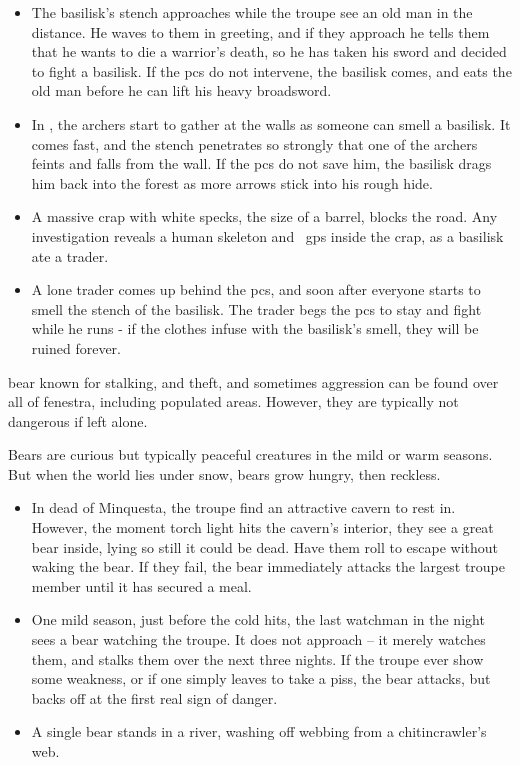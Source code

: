 \begin{multicols}{2}
\begin{itemize}
  \item{The basilisk's stench approaches while the troupe see an old man in the distance.
  He waves to them in greeting, and if they approach he tells them that he wants to die a warrior's death, so he has taken his sword and decided to fight a basilisk.
  If the \glspl{pc} do not intervene, the basilisk comes, and eats the old man before he can lift his heavy broadsword.}
  \item
  In , the archers start to gather at the walls as someone can smell a basilisk.
  It comes fast, and the stench penetrates so strongly that one of the archers feints and falls from the wall.
  If the \glspl{pc} do not save him, the basilisk drags him back into the forest as more arrows stick into his rough hide.
  \item
  \randomdozen
  A massive crap with white specks, the size of a barrel, blocks the road.
  Any investigation reveals a human skeleton and ~\glspl{gp} inside the crap, as a basilisk ate a trader.
  \item
  A lone trader comes up behind the \glspl{pc}, and soon after everyone starts to smell the stench of the basilisk.
  The trader begs the \glspl{pc} to stay and fight while he runs - if the clothes infuse with the basilisk's smell, they will be ruined forever.
\end{itemize}

  {bear}%
  {known for stalking, and theft, and sometimes aggression}%
can be found over all of \gls{fenestra}, including populated areas.
However, they are typically not dangerous if left alone.

\bear

\showEnc
Bears are curious but typically peaceful creatures in the mild or warm seasons.
But when the world lies under snow, bears grow hungry, then reckless.

\begin{itemize}
  \item
  In dead of \gls{Minquesta}, the troupe find an attractive cavern to rest in.
  However, the moment torch light hits the cavern's interior, they see a great bear inside, lying so still it could be dead.
  Have them roll  to escape without waking the bear.
  If they fail, the bear immediately attacks the largest troupe member until it has secured a meal.
  \item
  One mild season, just before the cold hits, the last watchman in the night sees a bear watching the troupe.
  It does not approach -- it merely watches them, and stalks them over the next three nights.
  If the troupe ever show some weakness, or if one simply leaves to take a piss, the bear attacks, but backs off at the first real sign of danger.
  \item
  A single bear stands in a river, washing off webbing from a chitincrawler's web.
\end{itemize}


\end{multicols}
